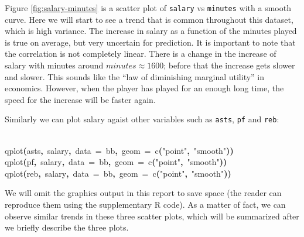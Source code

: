\documentclass[english]{article}
\newenvironment{dummy}{\par}{\par}
\newcommand{\hlfunctioncall}[1]{\textcolor[rgb]{1,0,0}{#1}}%
\newcommand{\hlstring}[1]{\textcolor[rgb]{0.6,0.6,1}{#1}}%
\newcommand{\hlkeyword}[1]{\textcolor[rgb]{0,0,0}{\textbf{#1}}}%
\newcommand{\hlargument}[1]{\textcolor[rgb]{0.694117647058824,0.247058823529412,0.0196078431372549}{#1}}%
\newcommand{\hlsymbol}[1]{\textcolor[rgb]{0,0,0}{#1}}%
\newcommand{\hlprompt}[1]{\textcolor[rgb]{0,0,0}{#1}}%
\newcommand{\hlstd}[1]{\textcolor[rgb]{0,0,0}{#1}}%
\begin{document}
Figure \ref{fig:salary-minutes} is a scatter plot of \texttt{salary}
vs \texttt{minutes} with a smooth curve. Here we will start to see
a trend that is common throughout this dataset, which is high variance.
The increase in salary as a function of the minutes played is true
on average, but very uncertain for prediction. It is important to
note that the correlation is not completely linear. There is a change
in the increase of salary with minutes around $minutes\approx1600$;
before that the increase gets slower and slower. This sounds like
the {}``law of diminishing marginal utility'' in economics. However,
when the player has played for an enough long time, the speed for
the increase will be faster again. 

Similarly we can plot salary agaist other variables such as \texttt{asts},
\texttt{pf} and \texttt{reb}:
\begin{dummy}
\hspace*{\fill}\\
\hlstd{}\ttfamily\noindent
\hlprompt{\usebox{\hlnormalsizeboxgreaterthan}{\ }}\hlfunctioncall{qplot}\hlkeyword{(}\hlsymbol{asts}\hlkeyword{,}{\ }\hlsymbol{salary}\hlkeyword{,}{\ }\hlargument{data}{\ }\hlargument{=}{\ }\hlsymbol{bb}\hlkeyword{,}{\ }\hlargument{geom}{\ }\hlargument{=}{\ }\hlfunctioncall{c}\hlkeyword{(}\hlstring{"point"}\hlkeyword{,}{\ }\hlstring{"smooth"}\hlkeyword{)}\hlkeyword{)}\mbox{}
\normalfont
\hspace*{\fill}\\
\hlstd{}\ttfamily\noindent
\hlprompt{\usebox{\hlnormalsizeboxgreaterthan}{\ }}\hlfunctioncall{qplot}\hlkeyword{(}\hlsymbol{pf}\hlkeyword{,}{\ }\hlsymbol{salary}\hlkeyword{,}{\ }\hlargument{data}{\ }\hlargument{=}{\ }\hlsymbol{bb}\hlkeyword{,}{\ }\hlargument{geom}{\ }\hlargument{=}{\ }\hlfunctioncall{c}\hlkeyword{(}\hlstring{"point"}\hlkeyword{,}{\ }\hlstring{"smooth"}\hlkeyword{)}\hlkeyword{)}\mbox{}
\normalfont
\hspace*{\fill}\\
\hlstd{}\ttfamily\noindent
\hlprompt{\usebox{\hlnormalsizeboxgreaterthan}{\ }}\hlfunctioncall{qplot}\hlkeyword{(}\hlsymbol{reb}\hlkeyword{,}{\ }\hlsymbol{salary}\hlkeyword{,}{\ }\hlargument{data}{\ }\hlargument{=}{\ }\hlsymbol{bb}\hlkeyword{,}{\ }\hlargument{geom}{\ }\hlargument{=}{\ }\hlfunctioncall{c}\hlkeyword{(}\hlstring{"point"}\hlkeyword{,}{\ }\hlstring{"smooth"}\hlkeyword{)}\hlkeyword{)}\mbox{}
\normalfont
\hspace*{\fill}\\
\hlstd{}
\end{dummy}
We will omit the graphics output in this report to save space (the
reader can reproduce them using the supplementary R code). As a matter
of fact, we can observe similar trends in these three scatter plots,
which will be summarized after we briefly describe the three plots.
\end{document}
